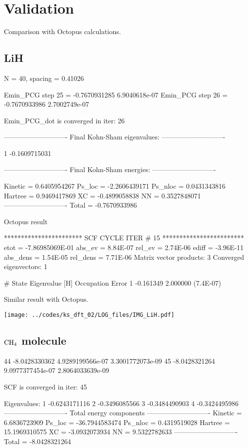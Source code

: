 \section{Validation}

Comparison with Octopus calculations.

\subsection{LiH}

N = 40, spacing = 0.41026
\begin{textcode}
Emin_PCG step       25 =      -0.7670931285  6.9040618e-07
Emin_PCG step       26 =      -0.7670933986  2.7002749e-07

Emin_PCG_dot is converged in iter: 26

----------------------------
Final Kohn-Sham eigenvalues:
----------------------------

  1      -0.1609715031

----------------------------
Final Kohn-Sham energies:
----------------------------

Kinetic =       0.6405954267
Ps_loc  =      -2.2606439171
Ps_nloc =       0.0431343816
Hartree =       0.9469417869
XC      =      -0.4899058838
NN      =       0.3527848071
----------------------------
Total   =      -0.7670933986
\end{textcode}

Octopus result
\begin{textcode}
*********************** SCF CYCLE ITER #   15 ************************
 etot  = -7.86985069E-01 abs_ev   =  8.84E-07 rel_ev   =  2.74E-06
 ediff =       -3.96E-11 abs_dens =  1.54E-05 rel_dens =  7.71E-06
Matrix vector products:      3
Converged eigenvectors:      1

#  State  Eigenvalue [H]  Occupation    Error
      1       -0.161349    2.000000   (7.4E-07)
\end{textcode}

Similar result with Octopus.

{\centering
\texttt{[image: ../codes/ks\_dft\_02/LOG\_files/IMG\_LiH.pdf]}
}



\subsection{$\ce{CH4}$ molecule}

\begin{textcode}
   44      -8.0428330362   4.9289199566e-07   3.3001772073e-09
   45      -8.0428321264   9.0977377454e-07   2.8064033639e-09

SCF is converged in iter: 45

Eigenvalues:
  1      -0.6243171116
  2      -0.3496085566
  3      -0.3484490903
  4      -0.3424495986
----------------------------
Total energy components
----------------------------
Kinetic =       6.6836723909
Ps_loc  =     -36.7944583474
Ps_nloc =       0.4319519028
Hartree =      15.1969310575
XC      =      -3.0932073934
NN      =       9.5322782633
----------------------------
Total   =      -8.0428321264 
\end{textcode}

